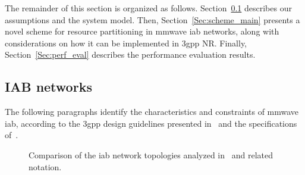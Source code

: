 The remainder of this section is organized as follows. Section~\ref{Sec:Sys-model} describes our assumptions and the system model. Then, Section~\ref{Sec:scheme_main} presents a novel scheme for resource partitioning in \gls{mmwave} \gls{iab} networks, along with considerations on how it can be implemented in \gls{3gpp} NR. Finally, Section~\ref{Sec:perf_eval} describes the performance evaluation results.

\subsection{IAB networks}
\label{Sec:Sys-model}

The following paragraphs identify the characteristics and constraints of \gls{mmwave} \gls{iab}, according to the \gls{3gpp} design guidelines presented in~\cite{3gpp_38_874} and the specifications of~\cite{3gpp_38_174}.

\begin{figure}[t!]
	\centering
  	\hfill
    \caption{Comparison of the \gls{iab} network topologies analyzed in~\cite{3gpp_38_874} and related notation.}
    \label{Fig:IAB_top_not}
\end{figure}

